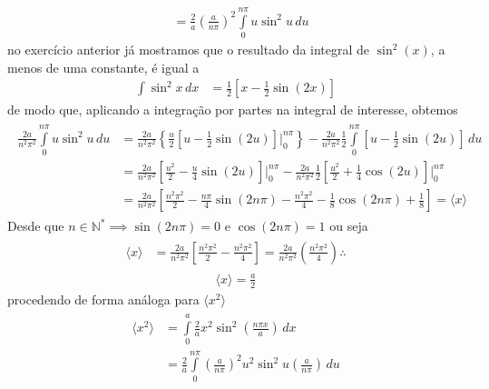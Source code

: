 \begin{prob}
\begin{sol}
\begin{equation*}
\begin{split}
													&=\frac{2}{a}\left(\frac{a}{n \pi}\right)^{2}\int\limits_{0}^{n \pi}u\sin^{2}{u}\,du
			\end{split}
		\end{equation*}
		no exercício anterior já mostramos que o resultado da integral de $\sin^{2}(x)$, a menos de uma constante, é igual a
		\begin{align}
			\int \sin^{2}x\,dx &= \frac{1}{2}\left[x-\frac{1}{2}\sin(2x)\right] 
		\end{align}
		de modo que, aplicando a integração por partes na integral de interesse, obtemos
		\begin{align}
			\begin{split}
				\frac{2a}{n^{2} \pi^{2}}\int\limits_{0}^{n \pi}u\sin^{2}u\,d{u} &= \frac{2a}{n^{2} \pi^{2}}\left\{\frac{u}{2}\left[u-\frac{1}{2}\sin(2u)\right]\Bigg|_{0}^{n \pi}\right\}-\frac{2a}{n^{2} \pi^{2}}\frac{1}{2}\int\limits_{0}^{n \pi}\left[u-\frac{1}{2}\sin(2u)\right]\,d{u}\\
																																				&= \frac{2a}{n^{2} \pi^{2}}\left[\frac{u^{2}}{2}-\frac{u}{4}\sin(2u)\right]\Bigg|_{0}^{n \pi}-\frac{2a}{n^{2} \pi^{2}}\frac{1}{2}\left[\frac{u^{2}}{2}+\frac{1}{4}\cos(2u)\right]\Bigg|_{0}^{n \pi}\\
																																				&= \frac{2a}{n^{2} \pi^{2}}\left[\frac{n^{2}{\pi^{2}}}{2}-\frac{n \pi}{4}\sin(2n \pi)-\frac{n^{2} \pi^{2}}{4}-\frac{1}{8}\cos(2n \pi)+\frac{1}{8}\right]=\langle x \rangle
			\end{split}
		\end{align}
		Desde que $n\in \mathbb{N^{*}}\implies \sin(2n \pi)=0$ e $\cos(2n \pi)=1$ ou seja
		\begin{align}
			\begin{split}
				\langle x \rangle &= \frac{2a}{n^{2} \pi^{2}}\left[\frac{n^{2} \pi^{2}}{2}-\frac{n^{2} \pi^{2}}{4}\right]=\frac{2a}{n^{2} \pi^{2}}\left(\frac{n^{2} \pi^{2}}{4}\right)\therefore
			\end{split}
		\end{align}
		\begin{align}
			\boxed{
				\langle x \rangle = \frac{a}{2}
			}
		\end{align}
		procedendo de forma análoga para $\langle x^{2} \rangle$
		\begin{align}
			\begin{split}
				\langle x^{2} \rangle	&= \int\limits_{0}^{a}\frac{2}{a}x^{2}\sin^{2}\left(\frac{n \pi x}{a}\right)\,d{x}\\
															&= \frac{2}{a}\int\limits_{0}^{n \pi}\left(\frac{a}{n \pi}\right)^{2}u^{2}\sin^{2}u \left(\frac{a}{n \pi}\right)\,d{u}\\

\end{split}
\end{align}
\end{sol}
\end{prob}
